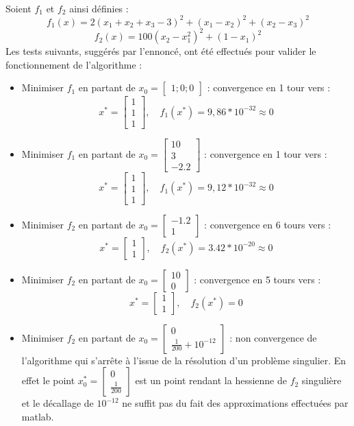 \documentclass[12pt]{article}	%
\begin{document}
\paragraph{}
Soient $f_1$ et $f_2$ ainsi définies :
	\[f_1(x) = 2(x_1 + x_2 + x_3 - 3)^2 + (x_1 - x_2)^2 + (x_2 - x_3)^2\]
	\[f_2(x) = 100(x_2 - x_1^2)^2+(1-x_1)^2\]
Les tests suivants, suggérés par l'ennoncé, ont été effectués pour valider le fonctionnement de l'algorithme :
\begin{itemize}
	\item Minimiser $f_1$ en partant de $x_0 = \left[\begin{array}{c}1; 0; 0\end{array}\right]$ : convergence en 1 tour vers :
			\[x^* = \left[\begin{array}{c}1\\1\\1\end{array}\right],\quad f_1(x^*) = 9,86*10^{-32} \approx 0\]
	\item Minimiser $f_1$ en partant de $x_0 = \left[\begin{array}{c}10\\3\\-2.2\end{array}\right]$ : convergence en 1 tour vers :
			\[x^* = \left[\begin{array}{c}1\\1\\1\end{array}\right],\quad f_1(x^*) = 9,12*10^{-32} \approx 0\]
	\item Minimiser $f_2$ en partant de $x_0 = \left[\begin{array}{c}-1.2\\1\end{array}\right]$ : convergence en 6 tours vers :
			\[x^* = \left[\begin{array}{c}1\\1\end{array}\right],\quad f_2(x^*) = 3.42*10^{-20} \approx 0\]
	\item Minimiser $f_2$ en partant de $x_0 = \left[\begin{array}{c}10\\0\end{array}\right]$ : convergence en 5 tours vers :
			\[x^* = \left[\begin{array}{c}1\\1\end{array}\right],\quad f_2(x^*) =  0\]
	\item Minimiser $f_2$ en partant de $x_0 = \left[\begin{array}{c}0\\\frac{1}{200} + 10^{-12}\end{array}\right]$ : non convergence de l'algorithme qui s'arrête à l'issue de la résolution d'un problème singulier. En effet le point $x_0^* = \left[\begin{array}{c}0\\\frac{1}{200}\end{array}\right]$ est un point rendant la hessienne de $f_2$ singulière et le décallage de $10^{-12}$ ne suffit pas du fait des approximations effectuées par matlab.
\end{itemize}
\end{document}
